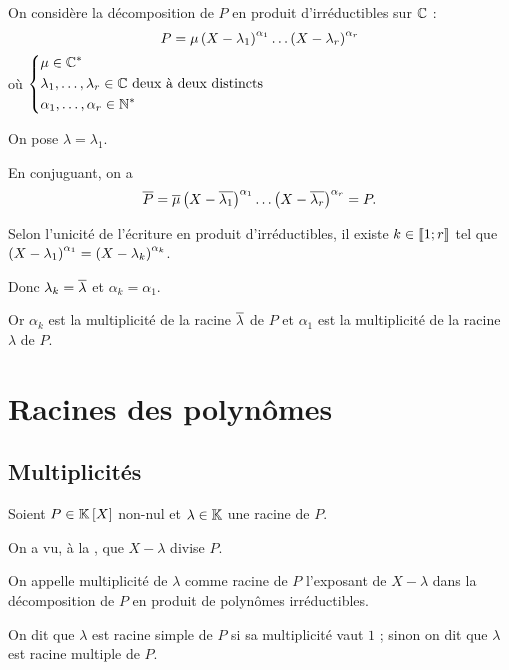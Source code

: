 \begin{dem}
On considère la décomposition de \(P\) en produit d'irréductibles sur \(\mathbb{C}\) : \[P=\mu\left(X-\lambda_1\right)^{\alpha_1}\dots\left(X-\lambda_r\right)^{\alpha_r}\] où \(\begin{dcases}\mu\in\mathbb{C}^* \\ \lambda_1,\dots,\lambda_r\in\mathbb{C}\text{ deux à deux distincts} \\ \alpha_1,\dots,\alpha_r\in\mathbb{N}^*\end{dcases}\)

On pose \(\lambda=\lambda_1\).

En conjuguant, on a \[\overline{P}=\overline{\mu}\left(X-\overline{\lambda_1}\right)^{\alpha_1}\dots\left(X-\overline{\lambda_r}\right)^{\alpha_r}=P.\]

Selon l'unicité de l'écriture en produit d'irréductibles, il existe \(k\in\left\llbracket1;r\right\rrbracket\) tel que \(\left(X-\lambda_1\right)^{\alpha_1}=\left(X-\lambda_k\right)^{\alpha_k}\).

Donc \(\lambda_k=\overline{\lambda}\) et \(\alpha_k=\alpha_1\).

Or \(\alpha_k\) est la multiplicité de la racine \(\overline{\lambda}\) de \(P\) et \(\alpha_1\) est la multiplicité de la racine \(\lambda\) de \(P\).
\end{dem}

\section{Racines des polynômes}

\subsection{Multiplicités}

\begin{defi}
Soient \(P\in\poly\) non-nul et \(\lambda\in\mathbb{K}\) une racine de \(P\).

On a vu, à la , que \(X-\lambda\) divise \(P\).

On appelle multiplicité de \(\lambda\) comme racine de \(P\) l'exposant de \(X-\lambda\) dans la décomposition de \(P\) en produit de polynômes irréductibles.

On dit que \(\lambda\) est racine simple de \(P\) si sa multiplicité vaut \(1\) ; sinon on dit que \(\lambda\) est racine multiple de \(P\).
\end{defi}

